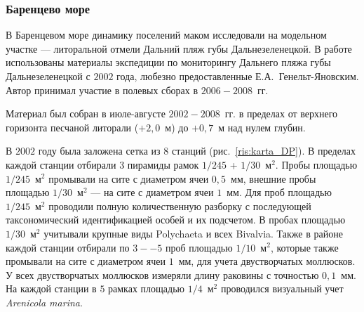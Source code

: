 

        \subsubsection{Баренцево море}

В Баренцевом море динамику поселений маком исследовали на модельном участке --- литоральной отмели Дальний пляж губы Дальнезеленецкой. 
В работе использованы материалы экспедиции по мониторингу Дальнего пляжа губы Дальнезеленецкой с $2002$ года, любезно предоставленные Е.\:А.~Генельт-Яновским.
Автор принимал участие в полевых сборах в $2006 - 2008$~гг.

Материал был собран в июле-августе $2002 - 2008$~гг. в пределах от верхнего горизонта песчаной литорали ($+2,0$~м) до $+0,7$~м над нулем глубин. 

 В $2002$ году была заложена сетка из $8$ станций (рис.~\ref{ris:karta_DP}). 
 В пределах каждой станции отбирали $3$ пирамиды рамок $1/245$ + $1/30$~м$^2$. 
 Пробы площадью $1/245$~м$^2$ промывали на сите с диаметром ячеи $0,5$~мм, внешние пробы площадью $1/30$~м$^2$ --- на сите с диаметром ячеи $1$~мм. 
 Для проб площадью $1/245$~м$^2$ проводили полную количественную разборку с последующей таксономический идентификацией особей и их подсчетом. 
 В пробах  площадью $1/30$~м$^2$ учитывали крупные виды Polychaeta и всех Bivalvia. 
 Также в районе каждой станции отбирали по $3--5$ проб площадью $1/10$~м$^2$, которые также промывали на сите с диаметром ячеи $1$~мм, для учета двустворчатых моллюсков.  
 У всех двустворчатых моллюсков измеряли длину раковины с точностью $0,1$~мм. 
 На каждой станции в $5$ рамках площадью $1/4$~м$^2$ проводился визуальный учет {\it Arenicola marina}.

